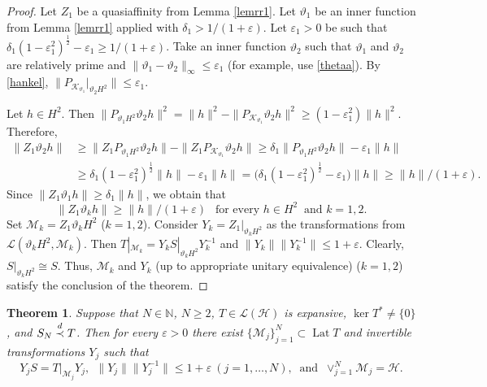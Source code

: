 \documentclass[a4paper,oneside,11pt]{amsart}
\numberwithin{equation}{section}
\theoremstyle{plain}
\newtheorem{theorem}{Theorem}[section]
\theoremstyle{definition}
\begin{document}
\begin{proof} 
Let $Z_1$ be  a quasiaffinity from Lemma \ref{lemrr1}.  Let $\vartheta_1$ be an inner function from 
Lemma \ref{lemrr1} applied with $\delta_1>1/(1+\varepsilon)$. 
Let $\varepsilon_1>0$ be such that 
$\delta_1(1-\varepsilon_1^2)^{\frac{1}{2}}-\varepsilon_1\geq 1/(1+\varepsilon)$. Take 
an inner function $\vartheta_2$ such that $\vartheta_1$ and $\vartheta_2$ are relatively prime and 
$\|\vartheta_1-\vartheta_2\|_\infty \leq\varepsilon_1$ (for example, use \eqref{thetaa}).
By \eqref{hankel}, $\|P_{\mathcal K_{\vartheta_1}}|_{\vartheta_2 H^2}\|\leq\varepsilon_1$.

 Let $h\in H^2$. Then 
$\|P_{\vartheta_1 H^2}\vartheta_2 h\|^2=\|h\|^2-\|P_{\mathcal K_{\vartheta_1}}\vartheta_2 h\|^2\geq(1-\varepsilon_1^2)\|h\|^2$. 
Therefore,
\begin{align*} \|Z_1\vartheta_2 h\|&\geq\|Z_1P_{\vartheta_1 H^2}\vartheta_2 h\|
-\|Z_1P_{\mathcal K_{\vartheta_1}}\vartheta_2 h\|
\geq\delta_1\|P_{\vartheta_1 H^2}\vartheta_2 h\|-\varepsilon_1\|h\|\\&
\geq\delta_1(1-\varepsilon_1^2)^{\frac{1}{2}}\|h\|-\varepsilon_1\|h\|=
\bigl(\delta_1(1-\varepsilon_1^2)^{\frac{1}{2}}-\varepsilon_1)\|h\|\geq \|h\|/(1+\varepsilon).
\end{align*}
Since  $\|Z_1\vartheta_1 h\|\geq\delta_1\|h\|$, we obtain that 
\begin{equation*}\|Z_1\vartheta_k h\|\geq\|h\|/(1+\varepsilon) \ \ \text{ for every }h\in H^2\ \text{ and } k=1,2.
\end{equation*}
Set $\mathcal M_k=Z_1\vartheta_kH^2$ ($k=1,2$). Consider  $Y_k=Z_1|_{\vartheta_k H^2}$ as the transformations from 
 $\mathcal L(\vartheta_k H^2,\mathcal M_k)$. Then $T|_{\mathcal M_k}=Y_k S|_{\vartheta_k H^2}Y_k^{-1}$ and 
 $\|Y_k\|\|Y_k^{-1}\|\leq1+\varepsilon$. Clearly, $S|_{\vartheta_k H^2}\cong S$. 
Thus, $\mathcal M_k$ and $Y_k$ (up to appropriate unitary equivalence) ($k=1,2$) satisfy the conclusion of the theorem.
\end{proof}

 
\begin{theorem} \label{thmnn} Suppose that $N\in\mathbb N$, $N\geq 2$,  $T\in\mathcal L(\mathcal H)$ is expansive, 
$\ker T^*\neq\{0\}$, 
and $S_N\buildrel d\over\prec T$. 
Then for every 
$\varepsilon>0$ there exist $\{\mathcal M_j\}_{j=1}^N\subset\operatorname{Lat}T$ 
and invertible transformations  $Y_j$ such that
\begin{equation*}Y_jS=T|_{\mathcal M_j}Y_j, \ \ \|Y_j\|\|Y_j^{-1}\|\leq 1+\varepsilon \ (j=1,\ldots,N), 
\ \text{ and }  \ \vee_{j=1}^N\mathcal M_j=\mathcal H. 
\end{equation*}

\end{theorem}
\end{document}
